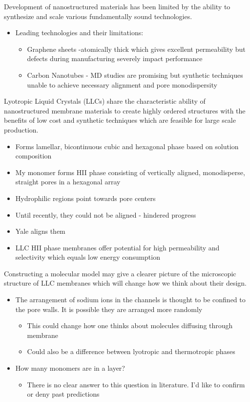 \documentclass{article}
\begin{document}
	Development of nanostructured materials has been limited by the ability to synthesize and scale various fundamentally sound technologies.
	\begin{itemize}
		\item Leading technologies and their limitations:
		\begin{itemize}
			\item Graphene sheets -atomically thick which gives excellent permeability but defects during manufacturing severely impact performance
			\item Carbon Nanotubes - MD studies are promising but synthetic techniques unable to achieve necessary alignment and pore monodispersity
		\end{itemize}
	\end{itemize} 
	Lyotropic Liquid Crystals (LLCs) share the characteristic ability of nanostructured membrane materials to create highly ordered structures with the benefits of low cost and synthetic techniques which are feasible for large scale production.
	\begin{itemize}
		\item Forms lamellar, bicontinuous cubic and hexagonal phase based on solution composition
		\item My monomer forms HII phase consisting of vertically aligned, monodisperse, straight pores in a hexagonal array
		\item Hydrophilic regions point towards pore centers
		\item Until recently, they could not be aligned - hindered progress
		\item Yale aligns them
		\item LLC HII phase membranes offer potential for high permeability and selectivity which equals low energy consumption
	\end{itemize}
	Constructing a molecular model may give a clearer picture of the microscopic structure of LLC membranes which will change how we think about their design.
	\begin{itemize}
		\item The arrangement of sodium ions in the channels is thought to be confined to the pore walls. It is possible they are arranged more randomly
		\begin{itemize}
			\item This could change how one thinks about molecules diffusing through membrane
			\item Could also be a difference between lyotropic and thermotropic phases
		\end{itemize}
		\item How many monomers are in a layer?
		\begin{itemize}
			\item There is no clear answer to this question in literature. I'd like to confirm or deny past predictions
		\end{itemize}
	\end{itemize}
	
\end{document}
